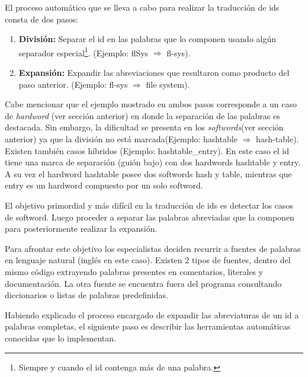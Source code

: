 \documentclass[a4paper,12pt]{report}
\begin{document}
El proceso automático que se lleva a cabo para realizar la traducción de ids consta de dos pasos\cite{LFBEX07}:

\begin{enumerate}
\itemsep0em%
\item \textbf{División:} Separar el id en las palabras que lo componen usando algún separador especial\footnote[1]{Siempre y cuando el id contenga más de una palabra.}. (Ejemplo: \textsf{flSys} $\Rightarrow$ \textsf{fl-sys}).

\item \textbf{Expansión:} Expandir las abreviaciones que resultaron como producto del paso anterior. (Ejemplo: \textsf{fl-sys} $\Rightarrow$ \textsf{file system}).
\end{enumerate}

Cabe mencionar que el ejemplo mostrado en ambos pasos corresponde a un caso de \textit{hardword} (ver sección anterior) en donde la separación de las palabras es destacada. Sin embargo, la dificultad se presenta en los \textit{softwords}(ver sección anterior) ya que la división no está marcada(Ejemplo: \textsf{hashtable} $\Rightarrow$ \textsf{hash-table}). Existen también casos híbridos (Ejemplo: \textsf{hashtable\_entry}). En este caso el id tiene una marca de separación (guión bajo) con dos hardwords \textsf{hashtable} y \textsf{entry}. A su vez el hardword \textsf{hashtable} posee dos softwords \textsf{hash} y \textsf{table}, mientras que \textsf{entry} es un hardword compuesto por un solo softword. 

\begin{framed}
\noindent El objetivo primordial y más difícil en la traducción de ids es detectar los casos de softword. Luego proceder a separar las palabras abreviadas que la componen para posteriormente realizar la expansión\cite{FBL06,LFBEX07}.  
\end{framed}

Para afrontar este objetivo los especialistas deciden recurrir a fuentes de palabras en lenguaje natural (inglés en este caso). Existen 2 tipos de fuentes, dentro del mismo código extrayendo palabras presentes en comentarios, literales y documentación. La otra fuente se encuentra fuera del programa consultando diccionarios o listas de palabras predefinidas. 

Habiendo explicado el proceso encargado de expandir las abreviaturas de un id a palabras completas, el siguiente paso es describir las herramientas automáticas conocidas que lo implementan. 
\end{document}
